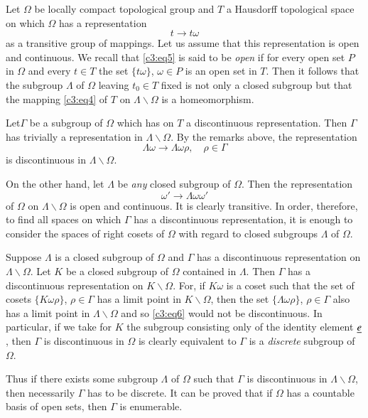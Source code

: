 Let $\Omega$ be locally compact topological group and $T$ a Hausdorff
topological space on which $\Omega$ has a representation
\begin{equation*}
t\to t\omega\tag{5}\label{c3:eq5}
\end{equation*}
as a transitive group of mappings. Let us assume that this
representation is open and continuous. We recall that \eqref{c3:eq5} is
said to be {\em open} if for every open set $P$ in $\Omega$ and every
$t\in T$ the set $\{t\omega\}$, $\omega\in P$ is an open set in
$T$. Then it follows that the subgroup $\Lambda$ of $\Omega$ leaving
$t_{0}\in T$ fixed is not only a closed subgroup but that the mapping
\eqref{c3:eq4} of $T$ on $\Lambda\backslash \Omega$ is a homeomorphism.

Let\pageoriginale $\Gamma$ be a subgroup of $\Omega$ which has on $T$
a discontinuous representation. Then $\Gamma$ has trivially a
representation in $\Lambda\backslash \Omega$. By the remarks above,
the representation
\begin{equation*}
\Lambda\omega\to \Lambda\omega\rho,\quad \rho\in\Gamma\tag{6}\label{c3:eq6}
\end{equation*}
is discontinuous in $\Lambda\backslash \Omega$.

On the other hand, let $\Lambda$ be {\em any} closed subgroup of
$\Omega$. Then the representation
$$
\omega'\to \Lambda\omega\omega'
$$
of $\Omega$ on $\Lambda\backslash\Omega$ is open and continuous. It is
clearly transitive. In order, therefore, to find all spaces on which
$\Gamma$ has a discontinuous representation, it is enough to consider
the spaces of right cosets of $\Omega$ with regard to closed subgroups
$\Lambda$ of $\Omega$.

Suppose $\Lambda$ is a closed subgroup of $\Omega$ and $\Gamma$ has a
discontinuous representation on $\Lambda\backslash\Omega$. Let $K$ be
a closed subgroup of $\Omega$ contained in $\Lambda$. Then $\Gamma$
has a discontinuous representation on $K\backslash\Omega$. For, if
$K\omega$ is a coset such that the set of cosets $\{K\omega\rho\}$,
$\rho\in\Gamma$ has a limit point in $K\backslash\Omega$, then the set
$\{\Lambda\omega\rho\}$, $\rho\in\Gamma$ also has a limit point in
$\Lambda\backslash\Omega$ and so \eqref{c3:eq6} would not be
discontinuous. In particular, if we take for $K$ the subgroup
consisting only of the identity element $\underline{e}$, then $\Gamma$ is
discontinuous in $\Omega$ is clearly equivalent to $\Gamma$ is a {\em
  discrete} subgroup of $\Omega$.

Thus if there exists some subgroup $\Lambda$ of $\Omega$ such that
$\Gamma$ is discontinuous in $\Lambda\backslash\Omega$, then
necessarily $\Gamma$ has to be discrete. It can be proved that if
$\Omega$ has a countable basis of open sets, then $\Gamma$ is
enumerable.

